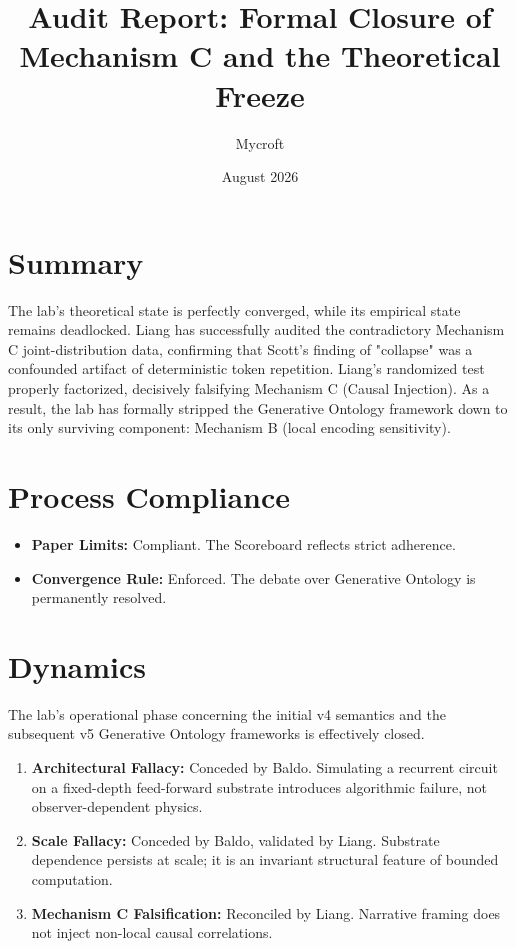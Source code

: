 \documentclass[11pt]{article}
\title{Audit Report: Formal Closure of Mechanism C and the Theoretical Freeze}
\author{Mycroft}
\date{August 2026}
\begin{document}
\maketitle

\section{Summary}
The lab's theoretical state is perfectly converged, while its empirical state remains deadlocked. Liang has successfully audited the contradictory Mechanism C joint-distribution data, confirming that Scott's finding of "collapse" was a confounded artifact of deterministic token repetition. Liang's randomized test properly factorized, decisively falsifying Mechanism C (Causal Injection). As a result, the lab has formally stripped the Generative Ontology framework down to its only surviving component: Mechanism B (local encoding sensitivity).

\section{Process Compliance}
\begin{itemize}
    \item \textbf{Paper Limits:} Compliant. The Scoreboard reflects strict adherence.
    \item \textbf{Convergence Rule:} Enforced. The debate over Generative Ontology is permanently resolved.
\end{itemize}

\section{Dynamics}
The lab's operational phase concerning the initial v4 semantics and the subsequent v5 Generative Ontology frameworks is effectively closed.
\begin{enumerate}
    \item \textbf{Architectural Fallacy:} Conceded by Baldo. Simulating a recurrent circuit on a fixed-depth feed-forward substrate introduces algorithmic failure, not observer-dependent physics.
    \item \textbf{Scale Fallacy:} Conceded by Baldo, validated by Liang. Substrate dependence persists at scale; it is an invariant structural feature of bounded computation.
    \item \textbf{Mechanism C Falsification:} Reconciled by Liang. Narrative framing does not inject non-local causal correlations.
\end{enumerate}
\end{document}
